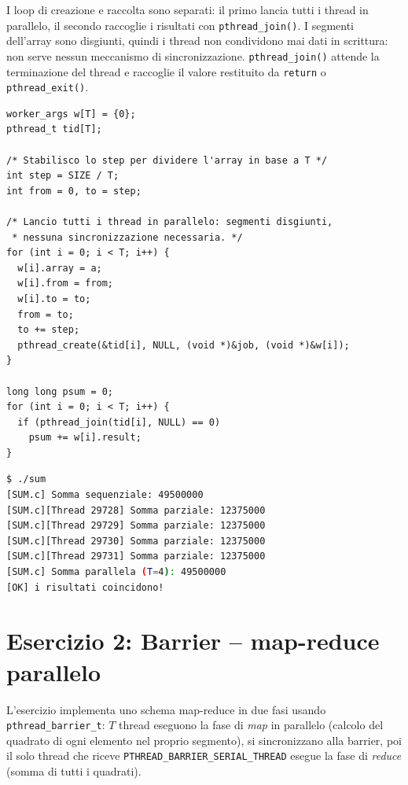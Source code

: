 \documentclass[a4paper,12pt]{article}
\begin{document}
I loop di creazione e raccolta sono separati: il primo lancia tutti i
thread in parallelo, il secondo raccoglie i risultati con
\texttt{pthread\_join()}.
I segmenti dell'array sono disgiunti, quindi i thread non condividono
mai dati in scrittura: non serve nessun meccanismo di sincronizzazione.
\texttt{pthread\_join()} attende la terminazione del thread e raccoglie
il valore restituito da \texttt{return} o \texttt{pthread\_exit()}.

\begin{lstlisting}[caption={Loop di creazione e raccolta separati}]
worker_args w[T] = {0};
pthread_t tid[T];

/* Stabilisco lo step per dividere l'array in base a T */
int step = SIZE / T;
int from = 0, to = step;

/* Lancio tutti i thread in parallelo: segmenti disgiunti,
 * nessuna sincronizzazione necessaria. */
for (int i = 0; i < T; i++) {
  w[i].array = a;
  w[i].from = from;
  w[i].to = to;
  from = to;
  to += step;
  pthread_create(&tid[i], NULL, (void *)&job, (void *)&w[i]);
}

long long psum = 0;
for (int i = 0; i < T; i++) {
  if (pthread_join(tid[i], NULL) == 0)
    psum += w[i].result;
}
\end{lstlisting}

\begin{lstlisting}[language=bash, caption={Test Esercizio 1}]
$ ./sum
[SUM.c] Somma sequenziale: 49500000
[SUM.c][Thread 29728] Somma parziale: 12375000
[SUM.c][Thread 29729] Somma parziale: 12375000
[SUM.c][Thread 29730] Somma parziale: 12375000
[SUM.c][Thread 29731] Somma parziale: 12375000
[SUM.c] Somma parallela (T=4): 49500000
[OK] i risultati coincidono!
\end{lstlisting}

\section{Esercizio 2: Barrier -- map-reduce parallelo}

L'esercizio implementa uno schema map-reduce in due fasi usando
\texttt{pthread\_barrier\_t}: $T$ thread eseguono la fase di \emph{map}
in parallelo (calcolo del quadrato di ogni elemento nel proprio segmento),
si sincronizzano alla barrier, poi il solo thread che riceve
\texttt{PTHREAD\_BARRIER\_SERIAL\_THREAD} esegue la fase di \emph{reduce}
(somma di tutti i quadrati).
\end{document}
